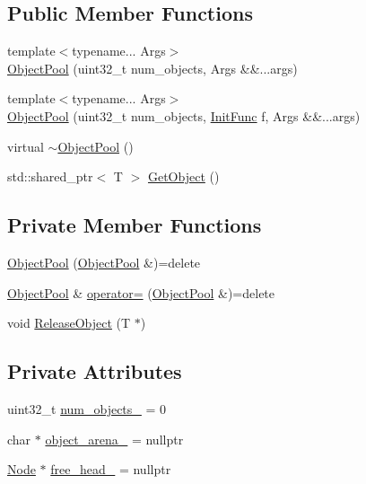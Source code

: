\subsection*{Public Member Functions}
\begin{DoxyCompactItemize}
\item 
{\footnotesize template$<$typename... Args$>$ }\\\hyperlink{classapollo_1_1cyber_1_1base_1_1ObjectPool_a8b01de4b6ca2c440f92828bcd98ca516}{Object\-Pool} (uint32\-\_\-t num\-\_\-objects, Args \&\&...args)
\item 
{\footnotesize template$<$typename... Args$>$ }\\\hyperlink{classapollo_1_1cyber_1_1base_1_1ObjectPool_ac3f237b9bc56ef248cb3b5e4a957608e}{Object\-Pool} (uint32\-\_\-t num\-\_\-objects, \hyperlink{classapollo_1_1cyber_1_1base_1_1ObjectPool_af46b770564c8080f800088ea25d9a830}{Init\-Func} f, Args \&\&...args)
\item 
virtual \hyperlink{classapollo_1_1cyber_1_1base_1_1ObjectPool_a3c7a5f92aecd8e99967b55036ca49fb5}{$\sim$\-Object\-Pool} ()
\item 
std\-::shared\-\_\-ptr$<$ T $>$ \hyperlink{classapollo_1_1cyber_1_1base_1_1ObjectPool_aff04cf85d0e04a74b5286b023d1613e2}{Get\-Object} ()
\end{DoxyCompactItemize}
\subsection*{Private Member Functions}
\begin{DoxyCompactItemize}
\item 
\hyperlink{classapollo_1_1cyber_1_1base_1_1ObjectPool_ad62c5841ee350f3e81e6c79b8471d70f}{Object\-Pool} (\hyperlink{classapollo_1_1cyber_1_1base_1_1ObjectPool}{Object\-Pool} \&)=delete
\item 
\hyperlink{classapollo_1_1cyber_1_1base_1_1ObjectPool}{Object\-Pool} \& \hyperlink{classapollo_1_1cyber_1_1base_1_1ObjectPool_acbac34af271062daba15ea32f0f74305}{operator=} (\hyperlink{classapollo_1_1cyber_1_1base_1_1ObjectPool}{Object\-Pool} \&)=delete
\item 
void \hyperlink{classapollo_1_1cyber_1_1base_1_1ObjectPool_aafd45e0efa58c46403e2a4ae066817a3}{Release\-Object} (T $\ast$)
\end{DoxyCompactItemize}
\subsection*{Private Attributes}
\begin{DoxyCompactItemize}
\item 
uint32\-\_\-t \hyperlink{classapollo_1_1cyber_1_1base_1_1ObjectPool_a83d8b9c2acc9e54022d86a6758087ad4}{num\-\_\-objects\-\_\-} = 0
\item 
char $\ast$ \hyperlink{classapollo_1_1cyber_1_1base_1_1ObjectPool_a611e7b13c400c42846d870fcc668ddfb}{object\-\_\-arena\-\_\-} = nullptr
\item 
\hyperlink{structapollo_1_1cyber_1_1base_1_1ObjectPool_1_1Node}{Node} $\ast$ \hyperlink{classapollo_1_1cyber_1_1base_1_1ObjectPool_a2b393acf60e1b2ec7a75006af09dda23}{free\-\_\-head\-\_\-} = nullptr
\end{DoxyCompactItemize}



